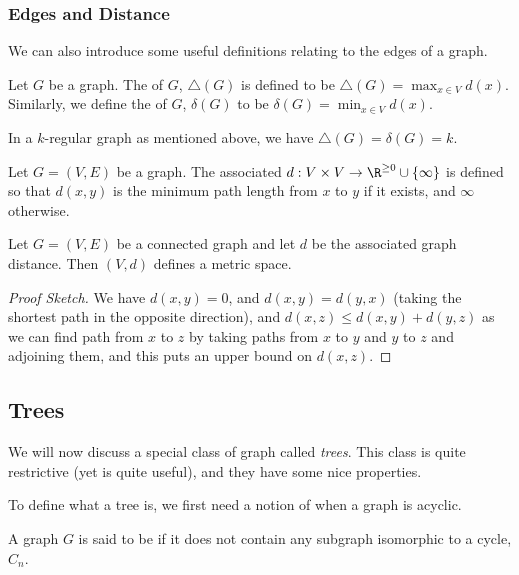 \documentclass[a4paper]{scrartcl}
\begin{document}
\subsubsection{Edges and Distance}

We can also introduce some useful definitions relating to the edges of a graph.

\begin{definition}
	Let $G$ be a graph. The  of $G$, $\triangle(G)$ is defined to be $\triangle(G) = \max_{x \in V} d(x)$. Similarly, we define the  of $G$, $\delta(G)$ to be $\delta(G) = \min_{x \in V} d(x)$.
\end{definition}

In a $k$-regular graph as mentioned above, we have $\triangle(G) = \delta(G) = k$.

\begin{definition}
Let $G = (V, E)$ be a graph. The associated  $d: V \times V \rightarrow \R^{\geq 0} \cup \{ \infty \}$ is defined so that $d(x, y)$ is the minimum path length from $x$ to $y$ if it exists, and $\infty$ otherwise.
\end{definition}

\begin{proposition}
	Let $G = (V, E)$ be a connected graph and let $d$ be the associated graph distance. Then $(V, d)$ defines a metric space.
\end{proposition}
\begin{proof}[Proof Sketch]
	We have $d(x, y) = 0$, and $d(x, y) = d(y, x)$ (taking the shortest path in the opposite direction), and $d(x, z) \leq d(x, y) + d(y, z)$ as we can find path from $x$ to $z$ by taking paths from $x$ to $y$ and $y$ to $z$ and adjoining them, and this puts an upper bound on $d(x, z)$.
\end{proof}

\subsection{Trees}

We will now discuss a special class of graph called \emph{trees}.
This class is quite restrictive (yet is quite useful), and they have some nice properties.

To define what a tree is, we first need a notion of when a graph is acyclic.

\begin{definition}[Acyclic]
	A graph $G$ is said to be  if it does not contain any subgraph isomorphic to a cycle, $C_n$.
\end{definition}
\end{document}

